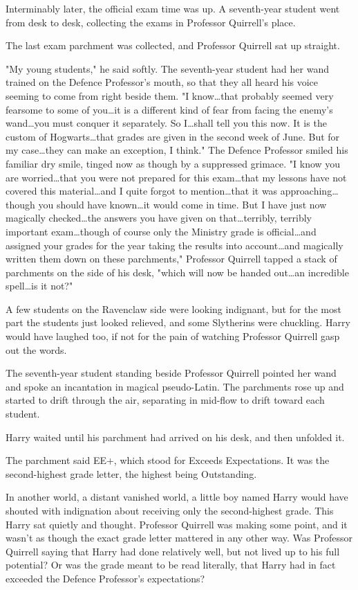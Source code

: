 Interminably later, the official exam time was up. A seventh-year student went
from desk to desk, collecting the exams in Professor Quirrell’s place.

The last exam parchment was collected, and Professor Quirrell sat up straight.

"My young students," he said softly. The seventh-year student had her wand
trained on the Defence Professor’s mouth, so that they all heard his voice
seeming to come from right beside them. "I know…that probably seemed
very fearsome to some of you…it is a different kind of fear from facing
the enemy’s wand…you must conquer it separately. So I…shall
tell you this now. It is the custom of Hogwarts…that grades are given
in the second week of June. But for my case…they can make an exception,
I think." The Defence Professor smiled his familiar dry smile, tinged now as
though by a suppressed grimace. "I know you are worried…that you were
not prepared for this exam…that my lessons have not covered this
material…and I quite forgot to mention…that it was
approaching…though you should have known…it would come in time.
But I have just now magically checked…the answers you have given on
that…terribly, terribly important exam…though of course
only the Ministry grade is official…and assigned your grades for the year
taking the results into account…and magically written them
down on these parchments," Professor Quirrell tapped a stack of parchments on
the side of his desk, "which will now be handed out…an incredible
spell…is it not?"

A few students on the Ravenclaw side were looking indignant, but for the most
part the students just looked relieved, and some Slytherins were chuckling.
Harry would have laughed too, if not for the pain of watching Professor
Quirrell gasp out the words.

The seventh-year student standing beside Professor Quirrell pointed her wand
and spoke an incantation in magical pseudo-Latin. The parchments rose up and
started to drift through the air, separating in mid-flow to drift toward each
student.

Harry waited until his parchment had arrived on his desk, and then unfolded it.

The parchment said EE+, which stood for Exceeds Expectations. It was the
second-highest grade letter, the highest being Outstanding.

In another world, a distant vanished world, a little boy named Harry would have
shouted with indignation about receiving only the second-highest grade. This
Harry sat quietly and thought. Professor Quirrell was making some point, and it
wasn’t as though the exact grade letter mattered in any other way. Was
Professor Quirrell saying that Harry had done relatively well, but not lived up
to his full potential? Or was the grade meant to be read literally, that Harry
had in fact exceeded the Defence Professor’s expectations?

